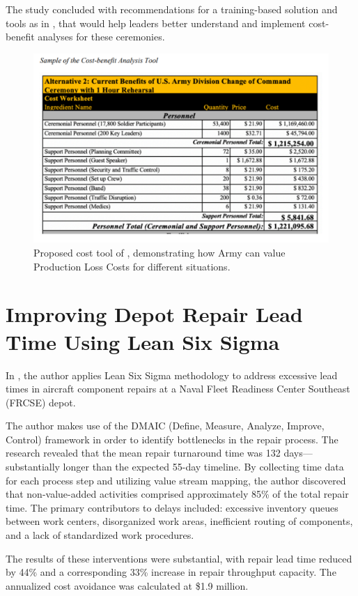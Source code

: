 \documentclass{article}
\begin{document}
			The study concluded with recommendations for a training-based solution and tools as in , that would help leaders better understand and implement cost-benefit analyses for these ceremonies. 
			
			\begin{figure}[htbp]
			\centering
			\includegraphics[width=0.4\linewidth,height=0.4\textheight,keepaspectratio]{figures/cost_tool.pdf}
			\caption{Proposed cost tool of \cite{Malin2020}, demonstrating how Army can value Production Loss Costs for different situations.}
			\label{fig:loss_tool}
			\end{figure}

		

		\section{Improving Depot Repair Lead Time Using Lean Six Sigma \cite{Richmond2023}}

			In \cite{Richmond2023}, the author applies Lean Six Sigma methodology to address excessive lead times in aircraft component repairs at a Naval Fleet Readiness Center Southeast (FRCSE) depot. 

			The author makes use of the DMAIC (Define, Measure, Analyze, Improve, Control) framework in order to identify bottlenecks in the repair process. 
			The research revealed that the mean repair turnaround time was 132 days—substantially longer than the expected 55-day timeline. 
			By collecting time data for each process step and utilizing value stream mapping, the author discovered that non-value-added activities comprised approximately 85\% of the total repair time. The primary contributors to delays included: excessive inventory queues between work centers, disorganized work areas, inefficient routing of components, and a lack of standardized work procedures.

			

			The results of these interventions were substantial, with repair lead time reduced by 44\% and a corresponding 33\% increase in repair throughput capacity. The annualized cost avoidance was calculated at \$1.9 million.
\end{document}
